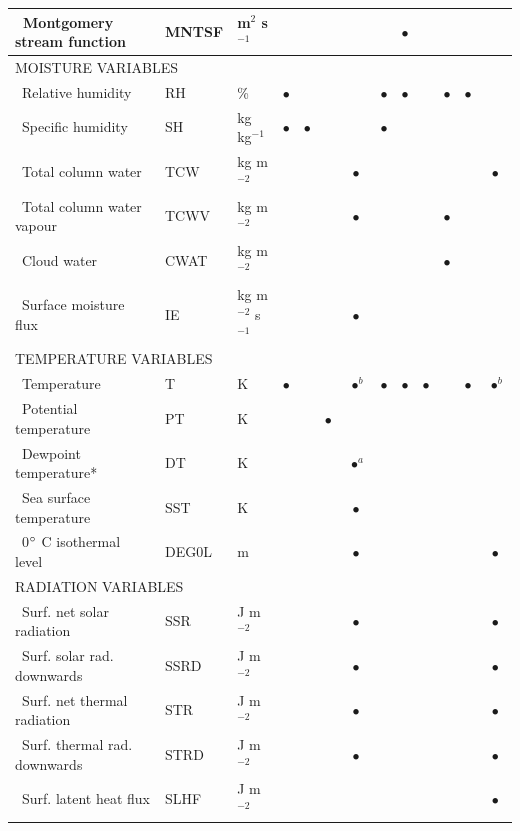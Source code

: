 \documentclass[draft]{agujournal2019}
\begin{document}
\begin{table}
{\begin{tabular}{lll|cccc|cccc|cc}
		\ Montgomery stream function & MNTSF & m$^{2}$ s$^{-1}$ &  &  &  &  &  & $\bullet$ &  &  & & \\
		\hline
		\multicolumn{3}{l|}{\uppercase{Moisture variables}} & & & & & & & & & & \\
		\ Relative humidity & RH & \% & $\bullet$ &  &  &  & $\bullet$ & $\bullet$ &  & $\bullet$ & $\bullet$ & \\
		\ Specific humidity & SH & kg kg$^{-1}$ & $\bullet$ & $\bullet$ &  &  & $\bullet$ &  &  & & &  \\
		\ Total column water & TCW & kg m$^{-2}$ &  &  &  & $\bullet$ &  &  &  &  & & $\bullet$\\
		\ Total column water vapour & TCWV & kg m$^{-2}$ &  &  &  & $\bullet$ &  &  &  & $\bullet$ & & \\
		\ Cloud water & CWAT & kg m$^{-2}$ &  &  &  &  &  &  &  & $\bullet$ & & \\
		\ Surface moisture flux & IE & kg m$^{-2}$ s$^{-1}$ &  &  &  & $\bullet$ &  &  &  &  & & \\
		\hline
		\multicolumn{3}{l|}{\uppercase{Temperature variables}} & & & & & & & & & & \\
		\ Temperature & T & K & $\bullet$ &  &  & $^{\ }\bullet^{b}$ & $\bullet$ & $\bullet$ & $\bullet$ &  & $\bullet$ & $^{\ }\bullet^{b}$ \\
		\ Potential temperature & PT & K &  &  & $\bullet$ &  &  &  &  &  & & \\
		\ Dewpoint temperature* & DT & K &  &  &  & $^{\ }\bullet^{a}$ &  &  &  &  & & \\
		\ Sea surface temperature & SST & K &  &  &  & $\bullet$ &  &  &  & & &  \\
		\ 0$\degree$ C isothermal level & DEG0L & m &  &  &  & $\bullet$ &  &  &  & & & $\bullet$ \\
		\hline
		\multicolumn{3}{l|}{\uppercase{Radiation variables}} & & & & & & & & & & \\
		\ Surf. net solar radiation & SSR & J m$^{-2}$ &  &  &  & $\bullet$ &  &  &  & & & $\bullet$ \\
		\ Surf. solar rad. downwards & SSRD & J m$^{-2}$ &  &  &  & $\bullet$ &  &  &  & & & $\bullet$ \\
		\ Surf. net thermal radiation & STR & J m$^{-2}$ &  &  &  & $\bullet$ &  &  &  & & & $\bullet$ \\
		\ Surf. thermal rad. downwards & STRD & J m$^{-2}$ &  &  &  & $\bullet$ &  &  &  & & & $\bullet$ \\
		\ Surf. latent heat flux & SLHF & J m$^{-2}$ &  &  &  &  &  &  &  & & & $\bullet$ \\

\end{tabular}}
\end{table}
\end{document}
